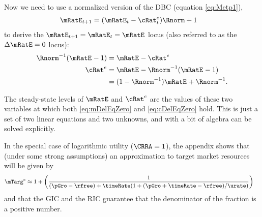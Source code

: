 \documentclass{\handout}
\begin{document}
Now we need to use a normalized version of the DBC (equation \eqref{eq:Metp1}),
\begin{equation}\begin{gathered}\begin{aligned}
        \mRatE_{t+1} & =  (\mRatE_{t}-{\cRat}^{e}_{t})\Rnorm+1 \label{eq:metp1}
\end{aligned}\end{gathered}\end{equation}
to derive the $\mRatE_{t+1}=\mRatE_{t}=\mRatE_{\tSS}$ locus (also referred
to as the $\dmEqZero$ locus): 
\begin{equation}\begin{gathered}\begin{aligned}
      \Rnorm^{-1}(\mRatE_{\tSS}-1) & =  \mRatE_{\tSS}-{\cRat}^{e}_{\tSS}
\\      {\cRat}^{e}_{\tSS} & =  \mRatE_{\tSS}-\Rnorm^{-1}(\mRatE_{\tSS}-1)
\\       & =  (1-\Rnorm^{-1})\mRatE_{\tSS}+\Rnorm^{-1}. \label{eq:mDelEqZero}
\end{aligned}\end{gathered}\end{equation}

The steady-state levels of $\mRatE$ and ${\cRat}^{e}$ are the values of these two variables at which both
\eqref{eq:mDelEqZero} and \eqref{eq:cDelEqZero} hold.  This is
just a set of two linear equations and two unknowns, and with a bit of 
algebra can be solved explicitly.

In the special case of logarithmic utility ($\CRRA = 1$), the
appendix shows that (under some strong assumptions) an approximation to target market resources will be given by
\begin{equation}\begin{gathered}\begin{aligned}
 \mTarg^{e} & \approx  1 + \left(\frac{1}{(\pGro-\rfree)+\timeRate(1+(\pGro+\timeRate-\rfree)/\urate)}\right) \label{eq:mTargetLogCase}
\end{aligned}\end{gathered}\end{equation}
and that the GIC and the RIC guarantee that the denominator of the fraction is a positive number.
\end{document}
